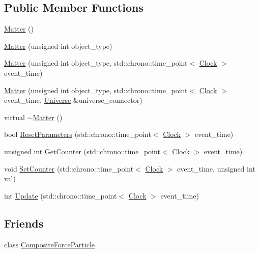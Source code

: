 \subsection*{Public Member Functions}
\begin{DoxyCompactItemize}
\item 
\hyperlink{class_matter_ac2dc2f5eeef03d3bdf41a68334ae49b4}{Matter} ()
\item 
\hyperlink{class_matter_a7e2328c2a17dcc7b57af59d1d5c9ea96}{Matter} (unsigned int object\+\_\+type)
\item 
\hyperlink{class_matter_ae15b0b8d811fb2ffd01ea039777d1b95}{Matter} (unsigned int object\+\_\+type, std\+::chrono\+::time\+\_\+point$<$ \hyperlink{universe_8h_a0ef8d951d1ca5ab3cfaf7ab4c7a6fd80}{Clock} $>$ event\+\_\+time)
\item 
\hyperlink{class_matter_a724543a0439d3099f5fc0eae68110b75}{Matter} (unsigned int object\+\_\+type, std\+::chrono\+::time\+\_\+point$<$ \hyperlink{universe_8h_a0ef8d951d1ca5ab3cfaf7ab4c7a6fd80}{Clock} $>$ event\+\_\+time, \hyperlink{class_universe}{Universe} \&universe\+\_\+connector)
\item 
virtual \hyperlink{class_matter_a646fca3d4176950aed6173e1378664e3}{$\sim$\+Matter} ()
\item 
bool \hyperlink{class_matter_adfd93d323e43d09fa8d8b7cdd2258611}{Reset\+Parameters} (std\+::chrono\+::time\+\_\+point$<$ \hyperlink{universe_8h_a0ef8d951d1ca5ab3cfaf7ab4c7a6fd80}{Clock} $>$ event\+\_\+time)
\item 
unsigned int \hyperlink{class_matter_ac667a2f3b6d5d2ce8469efe1596cdd62}{Get\+Counter} (std\+::chrono\+::time\+\_\+point$<$ \hyperlink{universe_8h_a0ef8d951d1ca5ab3cfaf7ab4c7a6fd80}{Clock} $>$ event\+\_\+time)
\item 
void \hyperlink{class_matter_a514b4a64589eb3fbc3db6b3b356bd687}{Set\+Counter} (std\+::chrono\+::time\+\_\+point$<$ \hyperlink{universe_8h_a0ef8d951d1ca5ab3cfaf7ab4c7a6fd80}{Clock} $>$ event\+\_\+time, unsigned int val)
\item 
int \hyperlink{class_matter_a56898dd51e5a675832bc82de285b3ef7}{Update} (std\+::chrono\+::time\+\_\+point$<$ \hyperlink{universe_8h_a0ef8d951d1ca5ab3cfaf7ab4c7a6fd80}{Clock} $>$ event\+\_\+time)
\end{DoxyCompactItemize}
\subsection*{Friends}
\begin{DoxyCompactItemize}
\item 
class \hyperlink{class_matter_a9bc6eb2a4c20ce83728a7c9a31b91f19}{Composite\+Force\+Particle}
\end{DoxyCompactItemize}
